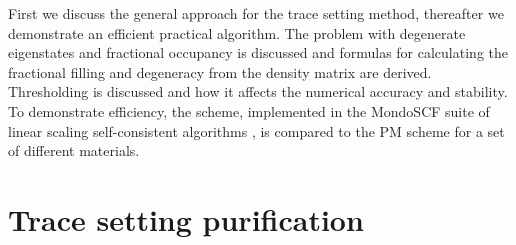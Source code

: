 First we discuss the general approach for the trace setting method,
thereafter we demonstrate an efficient practical algorithm. 
The problem with degenerate eigenstates and fractional occupancy is discussed and formulas 
for calculating the fractional filling and degeneracy from the density matrix 
are derived. Thresholding is discussed and how it affects
the numerical accuracy and stability.
To demonstrate efficiency, the scheme, implemented in the MondoSCF suite of linear 
scaling self-consistent algorithms \cite{Mondo}, is compared to the PM scheme 
for a set of different materials. 


\section{Trace setting purification}

